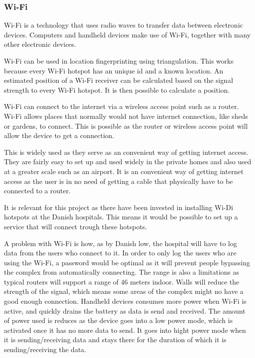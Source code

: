 \subsubsection{Wi-Fi} \label{wifitech}
Wi-Fi is a technology that uses radio waves to transfer data between electronic devices. Computers and handheld devices make use of Wi-Fi, together with many other electronic devices\cite{wifi_devices}.

Wi-Fi can be used in location fingerprinting using triangulation. This works because every Wi-Fi hotspot has an unique id and a known location. An estimated position of a Wi-Fi receiver can be calculated based on the signal strength to every Wi-Fi hotspot. It is then possible to calculate a position.\cite{Liu2007}

Wi-Fi can connect to the internet via a wireless access point such as a router. Wi-Fi allows places that normally would not have internet connection, like sheds or gardens, to connect. This is possible as the router or wireless access point will allow the device to get a connection.

This is widely used as they serve as an convenient way of getting internet access. They are fairly easy to set up and used widely in the private homes and also used at a greater scale such as an airport\cite{wifi_works}. It is an convenient way of getting internet access as the user is in no need of getting a cable that physically have to be connected to a router.

It is relevant for this project as there have been invested in installing Wi-Di hotspots at the Danish hospitals\cite{wifi_hospi}. This means it would be possible to set up a service that will connect trough these hotspots.

A problem with Wi-Fi is how, as by Danish low, the hospital will have to log data from the users who connect to it\cite{wifi_log}. In order to only log the users who are using the Wi-Fi, a password would be optimal as it will prevent people bypassing the complex from automatically connecting. The range is also a limitations as typical routers will support a range of 46 meters indoor\cite{wifi_range}. Walls will reduce the strength of the signal, which means some areas of the complex might no have a good enough connection\cite{wifi_wall}. Handheld devices consumes more power when Wi-Fi is active, and quickly drains the battery as data is send and received\cite{wifi_batt}. The amount of power used is reduces as the device goes into a low power mode, which is activated once it has no more data to send. It goes into hight power mode when it is sending/receiving data and stays there for the duration of which it is sending/receiving the data.
